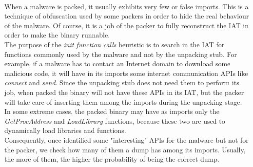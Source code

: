 \paragraph{}
When a malware is packed, it usually exhibits very few or false imports. This is a technique of obfuscation used by some packers in order to hide the real behaviour of the malware. Of course, it is a job of the packer to fully reconstruct the \ac{IAT} in order to make the binary runnable.\\
The purpose of the \textit{init function calls} heuristic is to search in the \ac{IAT} for functions commonly used by the malware and not by the unpacking stub. For example, if a malware has to contact an Internet domain to download some malicious code, it will have in its imports some internet communication \acp{API} like \textit{connect} and \textit{send}. Since the unpacking stub does not need them to perform its job, when packed the binary will not have these \acp{API} in its \ac{IAT}, but the packer will take care of inserting them among the imports during the unpacking stage. In some extreme cases, the packed binary may have as imports only the \textit{GetProcAddress} and \textit{LoadLibrary} functions, because these two are used to dynamically load libraries and functions.\\
Consequently, once identified some "interesting" \acp{API} for the malware but not for the packer, we check how many of them a dump has among its imports. Usually, the more of them, the higher the probability of being the correct dump.
\paragraph{}
